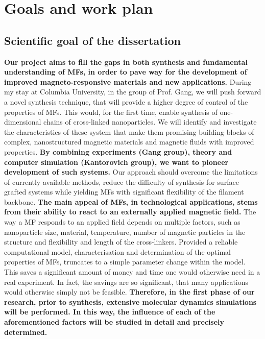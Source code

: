 \documentclass{article}
\begin{document}
\section{Goals and work plan}
\subsection{Scientific goal of the dissertation}
\textbf{Our project aims to fill the gaps in both synthesis and fundamental understanding of MFs, in order to pave way for the development of improved magneto-responsive materials and new applications.} During my stay at Columbia University, in the group of Prof. Gang, we will push forward a novel synthesis technique, that will provide a higher degree of control of the properties of MFs. This would, for the first time, enable synthesis of one-dimensional chains of cross-linked nanoparticles.  We will identify and investigate the characteristics of these system that make them promising building blocks of complex, nanostructured magnetic materials and magnetic fluids with improved properties. \textbf{By combining experiments (Gang group), theory and computer simulation (Kantorovich group), we want to pioneer development of such systems.} Our approach should overcome the limitations of currently available methods, reduce the difficulty of synthesis for surface grafted systems while yielding MFs with significant flexibility of the filament backbone.
\textbf{The main appeal of MFs, in technological applications, stems from their ability to react to an externally applied magnetic field.} The way a MF responds to an applied field depends on multiple factors, such as nanoparticle size, material, temperature, number of magnetic particles in the structure and flexibility and length of the cross-linkers. Provided a reliable computational model, characterisation and determination of the optimal properties of MFs, truncates to a simple parameter change within the model. This saves a significant amount of money and time one would otherwise need in a real experiment. In fact, the savings are so significant, that many applications would otherwise simply not be feasible. \textbf{Therefore, in the first phase of our research, prior to synthesis, extensive molecular dynamics simulations will be performed. In this way, the influence of each of the aforementioned factors will be studied in detail and precisely determined.}
\end{document}
